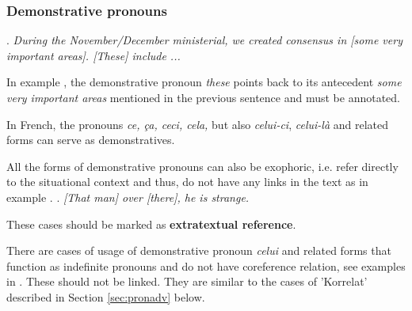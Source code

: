 \documentclass[a4paper]{article}
\begin{document}
\subsubsection{Demonstrative pronouns}

\ex.
{\sl During the November/December ministerial, we created consensus in [some very important areas]. [These] include ...}

In example \Last, the demonstrative pronoun {\sl these} points back to its antecedent {\sl some very important areas} mentioned in the previous sentence and must be annotated. 

In French, the pronouns \textsl{ce, ça, ceci, cela,} but also \textsl{celui-ci},
\textsl{celui-là} and related forms can serve as demonstratives.

% 

All the forms of demonstrative pronouns can also be exophoric, i.e. refer
directly to the situational context and thus, do not have any links in the text
as in example \Next. %
\ex.
\textsl{[That man] over [there], he is strange.}

These cases should be marked as {\bf extratextual reference}. 

There are cases of usage of demonstrative pronoun \textsl{celui} and related
forms that function as indefinite pronouns and do not have coreference relation,
see examples in \Next. These should not be linked. They are similar to the cases
of 'Korrelat' described in Section \ref{sec:pronadv} below.
\end{document}
